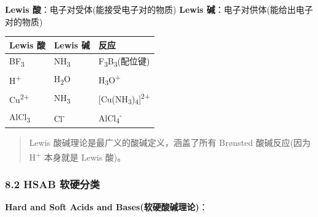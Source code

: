 \textbf{Lewis 酸}：电子对受体(能接受电子对的物质)
\textbf{Lewis 碱}：电子对供体(能给出电子对的物质)

{\def\LTcaptype{none} %
\begin{longtable}[]{@{}lll@{}}
\toprule\noalign{}
Lewis 酸 & Lewis 碱 & 反应 \\
\midrule\noalign{}
\endhead
\bottomrule\noalign{}
\endlastfoot
BF\textsubscript{3} & NH\textsubscript{3} & F\textsubscript{3}B\textsubscript{3}(配位键) \\
H\textsuperscript{+} & H\textsubscript{2}O & H\textsubscript{3}O\textsuperscript{+} \\
Cu\textsuperscript{2+} & NH\textsubscript{3} & {[}Cu(NH\textsubscript{3})\textsubscript{4}{]}\textsuperscript{2+} \\
AlCl\textsubscript{3} & Cl\textsuperscript{-} & AlCl\textsubscript{4}\textsuperscript{-} \\
\end{longtable}
}

\begin{quote}
Lewis 酸碱理论是最广义的酸碱定义，涵盖了所有 Brønsted 酸碱反应(因为 H\textsuperscript{+} 本身就是 Lewis 酸)。
\end{quote}

\subsubsection{8.2 HSAB 软硬分类}\label{hsab-ux8f6fux786cux5206ux7c7b}

\textbf{Hard and Soft Acids and Bases(软硬酸碱理论)}：


